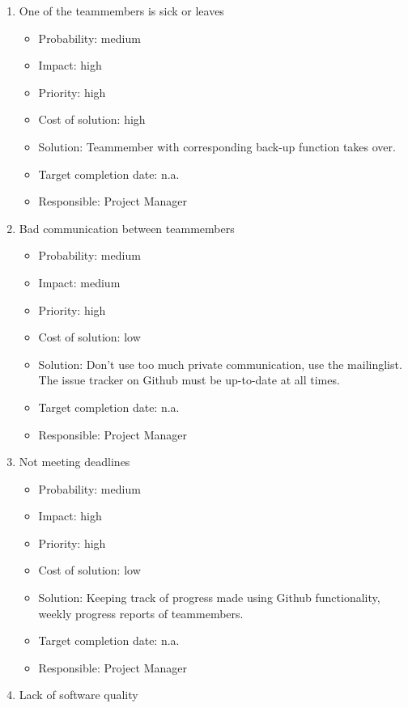 \documentclass[12pt]{article}
\begin{document}
\begin{enumerate}
\def\labelenumi{\arabic{enumi}.}
\itemsep1pt\parskip0pt
\item
  One of the teammembers is sick or leaves

  \begin{itemize}
  \itemsep1pt\parskip0pt
  \item
    Probability: medium
  \item
    Impact: high
  \item
    Priority: high
  \item
    Cost of solution: high
  \item
    Solution: Teammember with corresponding back-up function takes over.
  \item
    Target completion date: n.a.
  \item
    Responsible: Project Manager
  \end{itemize}
\item
  Bad communication between teammembers

  \begin{itemize}
  \itemsep1pt\parskip0pt
  \item
    Probability: medium
  \item
    Impact: medium
  \item
    Priority: high
  \item
    Cost of solution: low
  \item
    Solution: Don't use too much private communication, use the
    mailinglist. The issue tracker on Github must be
    up-to-date at all times.
  \item
    Target completion date: n.a.
  \item
    Responsible: Project Manager
  \end{itemize}
\item
  Not meeting deadlines

  \begin{itemize}
  \itemsep1pt\parskip0pt
  \item
    Probability: medium
  \item
    Impact: high
  \item
    Priority: high
  \item
    Cost of solution: low
  \item
    Solution: Keeping track of progress made using
    Github functionality, weekly progress reports of
    teammembers.
  \item
    Target completion date: n.a.
  \item
    Responsible: Project Manager
  \end{itemize}
\item
  Lack of software quality


\end{enumerate}
\end{document}
